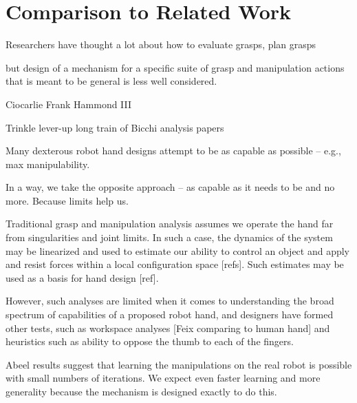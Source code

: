 \section{Comparison to Related Work}

Researchers have thought a lot about how to evaluate grasps, plan grasps

but design of a mechanism for a specific suite of grasp and manipulation actions that is meant to be general is less well considered.

Ciocarlie
Frank Hammond III

Trinkle lever-up
long train of Bicchi analysis papers


Many dexterous robot hand designs attempt to be as capable as possible -- e.g., max manipulability.  

In a way, we take the opposite approach -- as capable as it needs to be and no more.   Because limits help us.

Traditional grasp and manipulation analysis assumes we operate the hand far from singularities and joint limits.	   In such a case, the dynamics of the system may be linearized and used to estimate our ability to control an object and apply and resist forces within a local configuration space [refs].   Such estimates may be used as a basis for hand design [ref].

However, such analyses are limited when it comes to understanding the broad spectrum of capabilities of a proposed robot hand, and designers have formed other tests, such as workspace analyses [Feix comparing to human hand] and heuristics such as ability to oppose the thumb to each of the fingers.

Abeel results suggest that learning the manipulations on the real robot is possible with small numbers of iterations.   We expect even faster learning and more generality because the mechanism is designed exactly to do this.